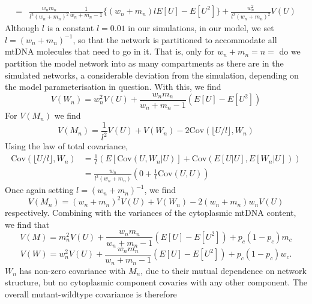 \documentclass{article}
\begin{document}
\begin{appendices}
{\begin{equation*}
\begin{split}
    =&\frac{w_nm_n}{l^2(w_n+m_n)^2}\frac{1}{w_n+m_n-1}\{(w_n+m_n)lE[U]-E[U^2]\}+\frac{w_n^2}{l^2(w_n+m_n)^2}V(U)
    \end{split}
\end{equation*}
Although $l$ is a constant $l=0.01$ in our simulations, in our model, we set $l=(w_n+m_n)^{-1}$, so that the network is partitioned to accommodate all mtDNA molecules that need to go in it. That is, only for $w_n+m_n=n=$ do we partition the model network into as many compartments as there are in the simulated networks, a considerable deviation from the simulation, depending on the model parameterisation in question. With this, we find}
\begin{equation}
    V(W_n) = w_n^2V(U)+\frac{w_nm_n}{w_n+m_n-1}(E[U]-E[U^2])
\end{equation}
For $V(M_n)$ we find
\begin{equation*}
    V(M_n)=\frac{1}{l^2}V(U)+V(W_n)-2\mathrm{Cov}(\lfloor U/l \rfloor,W_n)
\end{equation*}
Using the law of total covariance,
\begin{equation*}
\begin{split}
    \mathrm{Cov}(\lfloor U/l \rfloor,W_n)
    &=\frac{1}{l}\left(E[\mathrm{Cov}(U,W_n|U)]+\mathrm{Cov}(E[U|U],E[W_n|U])\right)\\
    &=\frac{w_n}{l^2(w_n+m_n)}\left(0+\frac{1}{l}\mathrm{Cov}(U,U)\right)
\end{split}
\end{equation*}
Once again setting $l=(w_n+m_n)^{-1}$, we find
\begin{equation}\label{eq:var-m-net-repel-temp}
    V(M_n) = (w_n+m_n)^2V(U)+V(W_n)-2(w_n+m_n)w_nV(U)
\end{equation}
respectively. Combining with the variances of the cytoplasmic mtDNA content, we find that
\begin{equation}\label{eq: app-var-m-repel}
V(M) = m_n^2V(U)+\frac{w_nm_n}{w_n+m_n-1}(E[U]-E[U^2])+p_c(1-p_c)m_c
\end{equation}
\begin{equation}\label{app:unif_varW}
V(W) = w_n^2V(U)+\frac{w_nm_n}{w_n+m_n-1}(E[U]-E[U^2])+p_c(1-p_c)w_c.
\end{equation}
$W_n$ has non-zero covariance with $M_n$, due to their mutual dependence on network structure, but no cytoplasmic component covaries with any other component. The overall mutant-wildtype covariance is therefore
\begin{equation*}
\begin{split}

\end{split}
\end{equation*}
\end{appendices}
\end{document}
